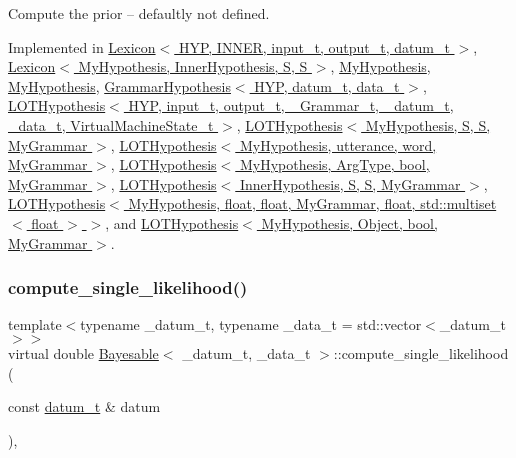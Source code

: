 Compute the prior -- defaultly not defined. 



Implemented in \hyperlink{class_lexicon_a2e099a68dd08d62897b40647f92eba1c}{Lexicon$<$ H\+Y\+P, I\+N\+N\+E\+R, input\+\_\+t, output\+\_\+t, datum\+\_\+t $>$}, \hyperlink{class_lexicon_a2e099a68dd08d62897b40647f92eba1c}{Lexicon$<$ My\+Hypothesis, Inner\+Hypothesis, S, S $>$}, \hyperlink{class_my_hypothesis_ab092094c5fc31730de4f40609220bb18}{My\+Hypothesis}, \hyperlink{class_my_hypothesis_a67477313b60b21158bbfaad35dc5d275}{My\+Hypothesis}, \hyperlink{class_grammar_hypothesis_a36c0ec17fb79f56fb4c71ed58f2625f6}{Grammar\+Hypothesis$<$ H\+Y\+P, datum\+\_\+t, data\+\_\+t $>$}, \hyperlink{class_l_o_t_hypothesis_af215c4833e81984364703b2e4cb78dc7}{L\+O\+T\+Hypothesis$<$ H\+Y\+P, input\+\_\+t, output\+\_\+t, \+\_\+\+Grammar\+\_\+t, \+\_\+datum\+\_\+t, \+\_\+data\+\_\+t, Virtual\+Machine\+State\+\_\+t $>$}, \hyperlink{class_l_o_t_hypothesis_af215c4833e81984364703b2e4cb78dc7}{L\+O\+T\+Hypothesis$<$ My\+Hypothesis, S, S, My\+Grammar $>$}, \hyperlink{class_l_o_t_hypothesis_af215c4833e81984364703b2e4cb78dc7}{L\+O\+T\+Hypothesis$<$ My\+Hypothesis, utterance, word, My\+Grammar $>$}, \hyperlink{class_l_o_t_hypothesis_af215c4833e81984364703b2e4cb78dc7}{L\+O\+T\+Hypothesis$<$ My\+Hypothesis, Arg\+Type, bool, My\+Grammar $>$}, \hyperlink{class_l_o_t_hypothesis_af215c4833e81984364703b2e4cb78dc7}{L\+O\+T\+Hypothesis$<$ Inner\+Hypothesis, S, S, My\+Grammar $>$}, \hyperlink{class_l_o_t_hypothesis_af215c4833e81984364703b2e4cb78dc7}{L\+O\+T\+Hypothesis$<$ My\+Hypothesis, float, float, My\+Grammar, float, std\+::multiset$<$ float $>$ $>$}, and \hyperlink{class_l_o_t_hypothesis_af215c4833e81984364703b2e4cb78dc7}{L\+O\+T\+Hypothesis$<$ My\+Hypothesis, Object, bool, My\+Grammar $>$}.

\mbox{\label{class_bayesable_a87d195bfe5cdf6d293dae5fc01ae2e6c}} 
\subsubsection{\texorpdfstring{compute\+\_\+single\+\_\+likelihood()}{compute\_single\_likelihood()}}
{\footnotesize\ttfamily template$<$typename \+\_\+datum\+\_\+t, typename \+\_\+data\+\_\+t = std\+::vector$<$\+\_\+datum\+\_\+t$>$$>$ \\
virtual double \hyperlink{class_bayesable}{Bayesable}$<$ \+\_\+datum\+\_\+t, \+\_\+data\+\_\+t $>$\+::compute\+\_\+single\+\_\+likelihood (\begin{DoxyParamCaption}\item[{const \hyperlink{class_bayesable_a9f1a6c0cd7855550fa10b1a8f13a5867}{datum\+\_\+t} \&}]{datum }\end{DoxyParamCaption})\hspace{0.3cm}{\ttfamily [inline]}, {\ttfamily [virtual]}}



